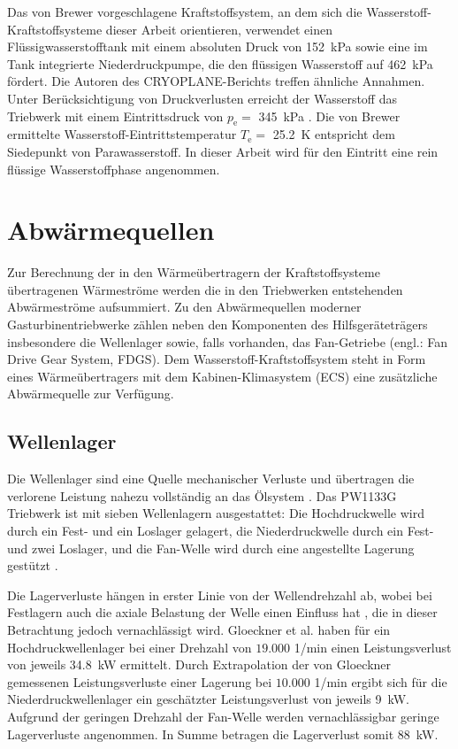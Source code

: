 Das von Brewer \cite{Brewer.1991} vorgeschlagene Kraftstoffsystem, an dem sich die Wasserstoff-Kraftstoffsysteme dieser Arbeit orientieren, verwendet einen Flüssigwasserstofftank mit einem absoluten Druck von \SI{152}{\kilo\Pa} sowie eine im Tank integrierte Niederdruckpumpe, die den flüssigen Wasserstoff auf \SI{462}{\kilo\Pa} fördert. Die Autoren des CRYOPLANE-Berichts \cite{Scholz.2003} treffen ähnliche Annahmen. Unter Berücksichtigung von Druckverlusten erreicht der Wasserstoff das Triebwerk mit einem Eintrittsdruck von $p_\mathrm{e}=$ \SI{345}{\kilo\Pa} \cite{Brewer.1991}. Die von Brewer ermittelte Wasserstoff-Eintrittstemperatur $T_\mathrm{e}=$ \SI{25.2}{\K} entspricht dem Siedepunkt von Parawasserstoff. In dieser Arbeit wird für den Eintritt eine rein flüssige Wasserstoffphase angenommen.

\section{Abwärmequellen}

Zur Berechnung der in den Wärmeübertragern der Kraftstoffsysteme übertragenen Wärmeströme werden die in den Triebwerken entstehenden Abwärmeströme aufsummiert. Zu den Abwärmequellen moderner Gasturbinentriebwerke zählen neben den Komponenten des Hilfsgeräteträgers insbesondere die Wellenlager sowie, falls vorhanden, das Fan-Getriebe (engl.: Fan Drive Gear System, FDGS). Dem Wasserstoff-Kraftstoffsystem steht in Form eines Wärmeübertragers mit dem Kabinen-Klimasystem (ECS) eine zusätzliche Abwärmequelle zur Verfügung. 

\subsection{Wellenlager}

Die Wellenlager sind eine Quelle mechanischer Verluste und übertragen die verlorene Leistung nahezu vollständig an das Ölsystem \cite{Gloeckner.2017}. Das PW1133G Triebwerk ist mit sieben Wellenlagern ausgestattet: Die Hochdruckwelle wird durch ein Fest- und ein Loslager gelagert, die Niederdruckwelle durch ein Fest- und zwei Loslager, und die Fan-Welle wird durch eine angestellte Lagerung gestützt \cite{AviationKnowledge.2022}. 

Die Lagerverluste hängen in erster Linie von der Wellendrehzahl ab, wobei bei Festlagern auch die axiale Belastung der Welle einen Einfluss hat \cite{Zhao.2023}, die in dieser Betrachtung jedoch vernachlässigt wird. Gloeckner et al. \cite{Gloeckner.2017} haben für ein Hochdruckwellenlager bei einer Drehzahl von $19.000$ 1/min einen Leistungsverlust von jeweils \SI{34.8}{\kilo\W} ermittelt. Durch Extrapolation der von Gloeckner \cite{Gloeckner.2013} gemessenen Leistungsverluste einer Lagerung bei $10.000$ 1/min ergibt sich für die Niederdruckwellenlager ein geschätzter Leistungsverlust von jeweils \SI{9}{\kilo\W}. Aufgrund der geringen Drehzahl der Fan-Welle werden vernachlässigbar geringe Lagerverluste angenommen. In Summe betragen die Lagerverlust somit \SI{88}{\kilo\W}.

